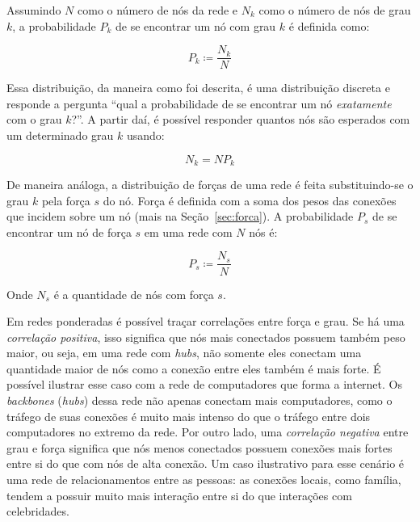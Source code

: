 \documentclass[12pt,a4paper]{article}
\theoremstyle{hypo}
\newcommand{\defn}{\coloneqq} %
\begin{document}
Assumindo $N$ como o número de nós da rede e $N_k$ como o número de nós de grau $k$, a probabilidade $P_k$ de se encontrar um nó com grau $k$ é definida como:

\begin{equation} \label{eq:probabilidade-grau}
P_k \defn \frac{N_k}{N}
\end{equation}

Essa distribuição, da maneira como foi descrita, é uma distribuição discreta e responde a pergunta \enquote{qual a probabilidade de se encontrar um nó \textit{exatamente}~ com o grau $k$?}. A partir daí, é possível responder quantos nós são esperados com um determinado grau $k$ usando:

\begin{equation}
N_k = NP_k
\end{equation} 

De maneira análoga, a distribuição de forças de uma rede é feita substituindo-se o grau $k$ pela força $s$ do nó. Força é definida com a soma dos pesos das conexões que incidem sobre um nó (mais na Seção~\ref{sec:forca}). A probabilidade $P_s$ de se encontrar um nó de força $s$ em uma rede com $N$ nós é:

\begin{equation} \label{eq:probabilidade-forca}
P_s \defn \frac{N_s}{N}
\end{equation}

Onde $N_s$ é a quantidade de nós com força $s$.

Em redes ponderadas é possível traçar correlações entre força e grau. Se há uma \textit{correlação positiva}, isso significa que nós mais conectados possuem também peso maior, ou seja, em uma rede com \textit{hubs}, não somente eles conectam uma quantidade maior de nós como a conexão entre eles também é mais forte. É possível ilustrar esse caso com a rede de computadores que forma a internet. Os \textit{backbones} (\textit{hubs}) dessa rede não apenas conectam mais computadores, como o tráfego de suas conexões é muito mais intenso do que o tráfego entre dois computadores no extremo da rede. Por outro lado, uma \textit{correlação negativa} entre grau e força significa que nós menos conectados possuem conexões mais fortes entre si do que com nós de alta conexão. Um caso ilustrativo para esse cenário é uma rede de relacionamentos entre as pessoas: as conexões locais, como família, tendem a possuir muito mais interação entre si do que interações com celebridades.
\end{document}
